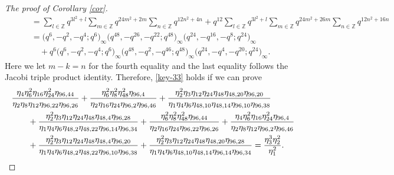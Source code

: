 \documentclass[10pt,a4paper]{amsart}
\numberwithin{equation}{section}
\theoremstyle{definition}
\begin{document}
\begin{proof}[The proof of Corollary \ref{cor}]
\begin{align*}
& \qquad =\sum_{l\in\mathbb{Z}}q^{3l^2+l}\sum_{m\in\mathbb{Z}}q^{24m^2+2m}\sum_{n\in\mathbb{Z}}q^{12n^2+4n}+q^{12}\sum_{l\in\mathbb{Z}}q^{3l^2+l}\sum_{m\in\mathbb{Z}}q^{24m^2+26m}\sum_{n\in\mathbb{Z}}q^{12n^2+16n}\\
& \qquad =\bigl(q^6,-q^2,-q^4;q^6\bigr)_{\infty} \bigl(q^{48},-q^{26},-q^{22};q^{48}\bigr)_{\infty}\bigl(q^{24},-q^{16},-q^8;q^{24}\bigr)_{\infty}\\
&\qquad\quad{} +q^6\bigl(q^6,-q^2,-q^4;q^6\bigr)_{\infty} \bigl(q^{48},-q^2,-q^{46};q^{48}\bigr)_{\infty}\bigl(q^{24},-q^4,-q^{20};q^{24}\bigr)_{\infty}.
\end{align*}
Here we let $m-k=n$ for the fourth equality and the last equality follows the Jacobi triple product identity. Therefore, \eqref{key-33} holds if we can prove
\begin{align}\notag
&\frac{\eta_4\eta^2_6\eta_{16}\eta^2_{24}\eta_{96,44}}{\eta_2\eta_8\eta_{12}\eta_{96,22}\eta_{96,26}}+\frac{\eta^2_6\eta^2_8\eta^2_{48}\eta_{96,4}}{\eta_2\eta_{16}\eta_{24}\eta_{96,2}\eta_{96,46}}+\frac{\eta^2_2
\eta_3\eta_{12}\eta_{24}\eta_{48}\eta_{48,20}\eta_{96,20}}{\eta_1\eta_4\eta_6\eta_{48,10}\eta_{48,14}\eta_{96,10}\eta_{96,38}}\\
&\qquad{} +\frac{\eta^2_2\eta_3\eta_{12}\eta_{24}\eta_{48}\eta_{48,4}\eta_{96,28}}{\eta_1\eta_4\eta_6\eta_{48,2}\eta_{48,22}\eta_{96,14}\eta_{96,34}}+\frac{\eta^2_6\eta^2_8\eta^2_{48}\eta_{96,44}}{\eta_2\eta_{16}\eta_{24}\eta_{96,22}\eta_{96,26}}+
\frac{\eta_4\eta^2_6\eta_{16}\eta^2_{24}\eta_{96,4}}{\eta_2\eta_8\eta_{12}\eta_{96,2}\eta_{96,46}}\notag\\
&\qquad{} +\frac{\eta^2_2\eta_3\eta_{12}\eta_{24}\eta_{48}\eta_{48,4}\eta_{96,20}}
{\eta_1\eta_4\eta_6\eta_{48,2}\eta_{48,22}\eta_{96,10}\eta_{96,38}} +\frac{\eta^2_2\eta_3\eta_{12}\eta_{24}\eta_{48}\eta_{48,20}\eta_{96,28}} {\eta_1\eta_4\eta_6\eta_{48,10}\eta_{48,14}\eta_{96,14}\eta_{96,34}}=\frac{\eta^3_3\eta^2_2}{\eta^2_1}.\label{key-id2}
\end{align}


\end{proof}
\end{document}
